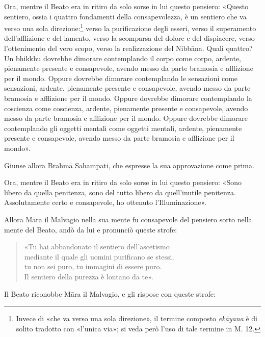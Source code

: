 
Ora, mentre il Beato era in ritiro da solo sorse in lui questo pensiero: «Questo
sentiero, ossia i quattro fondamenti della consapevolezza, è un sentiero che va
verso una sola direzione:\footnote{Invece di «che va verso una sola direzione»,
  il termine composto \emph{ekāyana} è di solito tradotto con «l’unica via»; si
  veda però l’uso di tale termine in M. 12.} verso la purificazione degli
esseri, verso il superamento dell’afflizione e del lamento, verso la scomparsa
del dolore e del dispiacere, verso l’ottenimento del vero scopo, verso la
realizzazione del Nibbāna. Quali quattro? Un bhikkhu dovrebbe dimorare
contemplando il corpo come corpo, ardente, pienamente presente e consapevole,
avendo messo da parte bramosia e afflizione per il mondo. Oppure dovrebbe
dimorare contemplando le sensazioni come sensazioni, ardente, pienamente
presente e consapevole, avendo messo da parte bramosia e afflizione per il
mondo. Oppure dovrebbe dimorare contemplando la coscienza come coscienza,
ardente, pienamente presente e consapevole, avendo messo da parte bramosia e
afflizione per il mondo. Oppure dovrebbe dimorare contemplando gli oggetti
mentali come oggetti mentali, ardente, pienamente presente e consapevole, avendo
messo da parte bramosia e afflizione per il mondo».

Giunse allora Brahmā Sahampati, che espresse la sua approvazione come prima.


Ora, mentre il Beato era in ritiro da solo sorse in lui questo pensiero: «Sono
libero da quella penitenza, sono del tutto libero da quell’inutile penitenza.
Assolutamente certo e consapevole, ho ottenuto l’Illuminazione».

Allora Māra il Malvagio nella sua mente fu consapevole del pensiero sorto nella
mente del Beato, andò da lui e pronunciò queste strofe:

\begin{quote}
«Tu hai abbandonato il sentiero dell’ascetismo \\
mediante il quale gli uomini purificano se stessi, \\
tu non sei puro, tu immagini di essere puro. \\
Il sentiero della purezza è lontano da te».
\end{quote}

Il Beato riconobbe Māra il Malvagio, e gli rispose con queste strofe:

